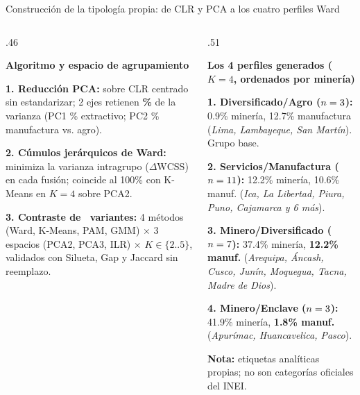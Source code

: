 \documentclass[aspectratio=169,11pt]{beamer}
\begin{document}
\begin{frame}[t]{Construcción de la tipología propia: de CLR y PCA a los cuatro perfiles Ward}
\vspace{.06cm}
\begin{columns}[T,onlytextwidth]
\begin{column}{.46\textwidth}
\begin{keybox}[equal height group=g4,top=1.6mm,bottom=1.6mm]
\textbf{Algoritmo y espacio de agrupamiento}\par\vspace{.05cm}
\footnotesize
\textbf{1. Reducción PCA:} sobre CLR centrado sin estandarizar; 2 ejes retienen \textbf{\PcaCumulative\%} de la varianza (PC1 \PcaOne\% extractivo; PC2 \PcaTwo\% manufactura vs. agro).\par\vspace{.05cm}
\textbf{2. Cúmulos jerárquicos de Ward:} minimiza la varianza intragrupo ($\Delta\text{WCSS}$) en cada fusión; coincide al 100\% con K-Means en $K=4$ sobre PCA2.\par\vspace{.05cm}
\textbf{3. Contraste de \SpecCount\ variantes:} 4 métodos (Ward, K-Means, PAM, GMM) $\times$ 3 espacios (PCA2, PCA3, ILR) $\times$ $K\in\{2..5\}$, validados con Silueta, Gap y Jaccard sin reemplazo.
\end{keybox}
\end{column}
\begin{column}{.51\textwidth}
\begin{keybox}[equal height group=g4,top=1.6mm,bottom=1.6mm]
\textbf{Los 4 perfiles generados ($K=4$, ordenados por minería)}\par\vspace{.05cm}
\scriptsize
\textbf{1. Diversificado/Agro ($n=3$):} 0.9\% minería, 12.7\% manufactura (\emph{Lima, Lambayeque, San Martín}). Grupo base.\par\vspace{.04cm}
\textbf{2. Servicios/Manufactura ($n=11$):} 12.2\% minería, 10.6\% manuf. (\emph{Ica, La Libertad, Piura, Puno, Cajamarca y 6 más}).\par\vspace{.04cm}
\textbf{3. Minero/Diversificado ($n=7$):} 37.4\% minería, \textbf{12.2\% manuf.} (\emph{Arequipa, Áncash, Cusco, Junín, Moquegua, Tacna, Madre de Dios}).\par\vspace{.04cm}
\textbf{4. Minero/Enclave ($n=3$):} 41.9\% minería, \textbf{1.8\% manuf.} (\emph{Apurímac, Huancavelica, Pasco}).\par\vspace{.05cm}
\textcolor{ccdeaccent}{\bfseries Nota:} etiquetas analíticas propias; no son categorías oficiales del INEI.
\end{keybox}
\end{column}
\end{columns}
\end{frame}
\end{document}
